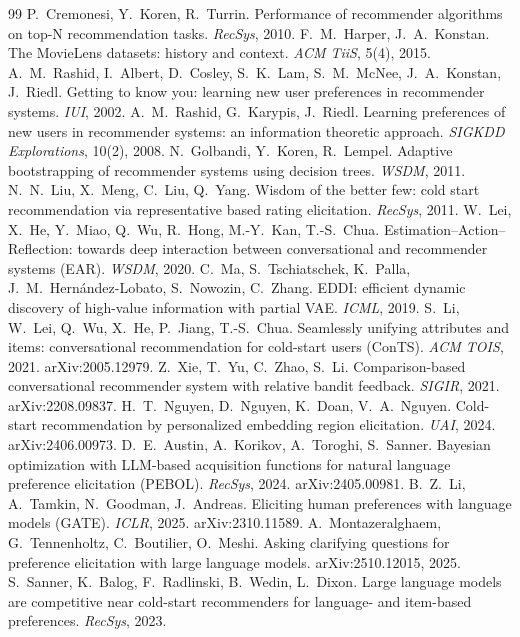 \documentclass[11pt]{article}
\begin{document}
\begin{thebibliography}{99}
 P.~Cremonesi, Y.~Koren, R.~Turrin. Performance of recommender algorithms on top-N recommendation tasks. \emph{RecSys}, 2010.
 F.~M.~Harper, J.~A.~Konstan. The MovieLens datasets: history and context. \emph{ACM TiiS}, 5(4), 2015.
 A.~M.~Rashid, I.~Albert, D.~Cosley, S.~K.~Lam, S.~M.~McNee, J.~A.~Konstan, J.~Riedl. Getting to know you: learning new user preferences in recommender systems. \emph{IUI}, 2002.
 A.~M.~Rashid, G.~Karypis, J.~Riedl. Learning preferences of new users in recommender systems: an information theoretic approach. \emph{SIGKDD Explorations}, 10(2), 2008.
 N.~Golbandi, Y.~Koren, R.~Lempel. Adaptive bootstrapping of recommender systems using decision trees. \emph{WSDM}, 2011.
 N.~N.~Liu, X.~Meng, C.~Liu, Q.~Yang. Wisdom of the better few: cold start recommendation via representative based rating elicitation. \emph{RecSys}, 2011.
 W.~Lei, X.~He, Y.~Miao, Q.~Wu, R.~Hong, M.-Y.~Kan, T.-S.~Chua. Estimation--Action--Reflection: towards deep interaction between conversational and recommender systems (EAR). \emph{WSDM}, 2020.
 C.~Ma, S.~Tschiatschek, K.~Palla, J.~M.~Hern\'andez-Lobato, S.~Nowozin, C.~Zhang. EDDI: efficient dynamic discovery of high-value information with partial VAE. \emph{ICML}, 2019.
 S.~Li, W.~Lei, Q.~Wu, X.~He, P.~Jiang, T.-S.~Chua. Seamlessly unifying attributes and items: conversational recommendation for cold-start users (ConTS). \emph{ACM TOIS}, 2021. arXiv:2005.12979.
 Z.~Xie, T.~Yu, C.~Zhao, S.~Li. Comparison-based conversational recommender system with relative bandit feedback. \emph{SIGIR}, 2021. arXiv:2208.09837.
 H.~T.~Nguyen, D.~Nguyen, K.~Doan, V.~A.~Nguyen. Cold-start recommendation by personalized embedding region elicitation. \emph{UAI}, 2024. arXiv:2406.00973.
 D.~E.~Austin, A.~Korikov, A.~Toroghi, S.~Sanner. Bayesian optimization with LLM-based acquisition functions for natural language preference elicitation (PEBOL). \emph{RecSys}, 2024. arXiv:2405.00981.
 B.~Z.~Li, A.~Tamkin, N.~Goodman, J.~Andreas. Eliciting human preferences with language models (GATE). \emph{ICLR}, 2025. arXiv:2310.11589.
 A.~Montazeralghaem, G.~Tennenholtz, C.~Boutilier, O.~Meshi. Asking clarifying questions for preference elicitation with large language models. arXiv:2510.12015, 2025.
 S.~Sanner, K.~Balog, F.~Radlinski, B.~Wedin, L.~Dixon. Large language models are competitive near cold-start recommenders for language- and item-based preferences. \emph{RecSys}, 2023.

\end{thebibliography}
\end{document}
